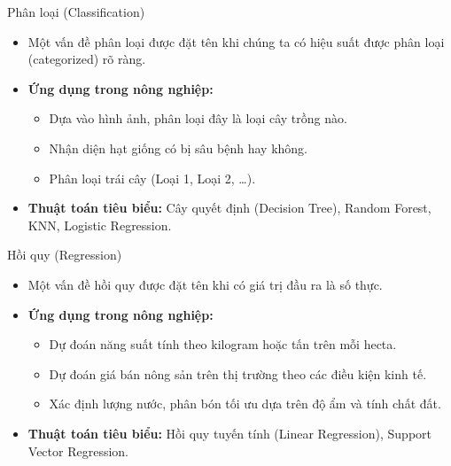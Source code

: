 \documentclass[aspectratio=169]{beamer}
\begin{document}
\begin{frame}{Phân loại (Classification)}
    \begin{itemize}
        \item Một vấn đề phân loại được đặt tên khi chúng ta có hiệu suất được phân loại (categorized) rõ ràng.
        \item \textbf{Ứng dụng trong nông nghiệp:}
        \begin{itemize}
            \item Dựa vào hình ảnh, phân loại đây là loại cây trồng nào.
            \item Nhận diện hạt giống có bị sâu bệnh hay không.
            \item Phân loại trái cây (Loại 1, Loại 2, \dots).
        \end{itemize}
        \item \textbf{Thuật toán tiêu biểu:} Cây quyết định (Decision Tree), Random Forest, KNN, Logistic Regression.
    \end{itemize}
\end{frame}

\begin{frame}{Hồi quy (Regression)}
    \begin{itemize}
        \item Một vấn đề hồi quy được đặt tên khi có giá trị đầu ra là số thực.
        \item \textbf{Ứng dụng trong nông nghiệp:}
        \begin{itemize}
            \item Dự đoán năng suất tính theo kilogram hoặc tấn trên mỗi hecta.
            \item Dự đoán giá bán nông sản trên thị trường theo các điều kiện kinh tế.
            \item Xác định lượng nước, phân bón tối ưu dựa trên độ ẩm và tính chất đất.
        \end{itemize}
        \item \textbf{Thuật toán tiêu biểu:} Hồi quy tuyến tính (Linear Regression), Support Vector Regression.
    \end{itemize}
\end{frame}
\end{document}
